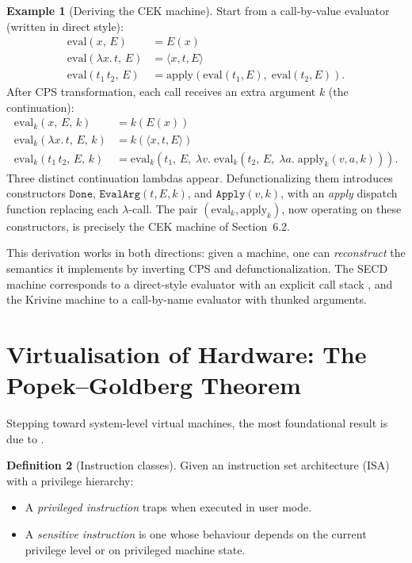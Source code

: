 \documentclass[11pt, a4paper]{article}
\theoremstyle{definition}
\newtheorem{definition}{Definition}[section]
\newtheorem{example}[definition]{Example}
\theoremstyle{plain}
\theoremstyle{remark}
\begin{document}
\begin{example}[Deriving the CEK machine]
  Start from a call-by-value evaluator (written in direct style):
  \begin{align*}
    \mathrm{eval}(x,\, E) &= E(x) \\
    \mathrm{eval}(\lambda x.\,t,\, E) &= \langle x,t,E \rangle \\
    \mathrm{eval}(t_1\,t_2,\, E) &=
      \mathrm{apply}(\mathrm{eval}(t_1,E),\;\mathrm{eval}(t_2,E)).
  \end{align*}
  After CPS transformation, each call receives an extra argument $k$
  (the continuation):
  \begin{align*}
    \mathrm{eval}_k(x,\, E,\, k) &= k(E(x)) \\
    \mathrm{eval}_k(\lambda x.\,t,\, E,\, k) &= k(\langle x,t,E\rangle) \\
    \mathrm{eval}_k(t_1\,t_2,\, E,\, k) &=
      \mathrm{eval}_k\!\left(t_1,\, E,\; \lambda v.\;
        \mathrm{eval}_k\!\left(t_2,\, E,\; \lambda a.\;
          \mathrm{apply}_k(v, a, k)\right)\right).
  \end{align*}
  Three distinct continuation lambdas appear.  Defunctionalizing them
  introduces constructors $\mathtt{Done}$, $\mathtt{EvalArg}(t, E, k)$,
  and $\mathtt{Apply}(v, k)$, with an \emph{apply} dispatch function
  replacing each $\lambda$-call.  The pair
  $(\mathrm{eval}_k, \mathrm{apply}_k)$, now operating on these
  constructors, is precisely the CEK machine of Section~6.2.
\end{example}

This derivation works in both directions: given a machine, one can
\emph{reconstruct} the semantics it implements by inverting CPS and
defunctionalization.  The SECD machine corresponds to a direct-style
evaluator with an explicit call stack \citep{danvy2003secd}, and the
Krivine machine to a call-by-name evaluator with thunked arguments.


\section{Virtualisation of Hardware: The Popek--Goldberg Theorem}

Stepping toward system-level virtual machines, the most foundational result
is due to \citet{popek1974}.

\begin{definition}[Instruction classes]
  Given an instruction set architecture (ISA) with a privilege hierarchy:
  \begin{itemize}
    \item A \emph{privileged instruction} traps when executed in user mode.
    \item A \emph{sensitive instruction} is one whose behaviour depends on
          the current privilege level or on privileged machine state.
  \end{itemize}
\end{definition}
\end{document}
